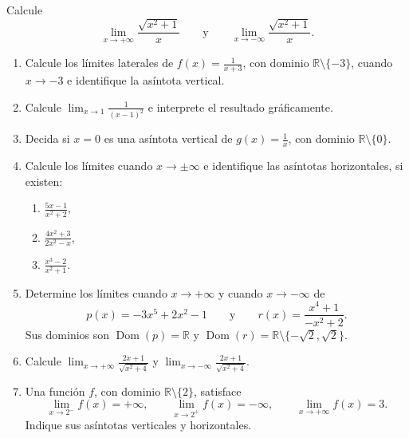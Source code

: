 \documentclass[10pt,a5paper]{article}
\newif\ifmostrarSoluciones
\begin{document}
\begin{ejemplo}
Calcule
\[
  \lim_{x\to+\infty}\frac{\sqrt{x^2+1}}{x}
  \qquad\text{y}\qquad
  \lim_{x\to-\infty}\frac{\sqrt{x^2+1}}{x}.
\]
\end{ejemplo}
\ifmostrarSoluciones
\begin{solucion}
Factorizamos $x^2$ dentro de la raíz:
\[
  \frac{\sqrt{x^2+1}}{x}
  =\frac{\sqrt{x^2\left(1+1/x^2\right)}}{x}
  =\frac{|x|}{x}\sqrt{1+\frac{1}{x^2}}.
\]
Si $x\to+\infty$, entonces $|x|/x=1$; si $x\to-\infty$, entonces $|x|/x=-1$. Por tanto,
\[
  \lim_{x\to+\infty}\frac{\sqrt{x^2+1}}{x}=1,
  \qquad
  \lim_{x\to-\infty}\frac{\sqrt{x^2+1}}{x}=-1.
\]
La gráfica tiene dos asíntotas horizontales: $y=1$ hacia la derecha y $y=-1$ hacia la izquierda.
\end{solucion}
\else\vspace{22mm}\fi

\begin{ejercicios}
\begin{enumerate}
  \item Calcule los límites laterales de $\displaystyle f(x)=\frac{1}{x+3}$, con dominio $\mathbb{R}\setminus\{-3\}$, cuando $x\to-3$ e identifique la asíntota vertical.
  \item Calcule $\displaystyle\lim_{x\to1}\frac{1}{(x-1)^2}$ e interprete el resultado gráficamente.
  \item Decida si $x=0$ es una asíntota vertical de $\displaystyle g(x)=\frac{1}{x}$, con dominio $\mathbb{R}\setminus\{0\}$.
  \item Calcule los límites cuando $x\to\pm\infty$ e identifique las asíntotas horizontales, si existen:
  \begin{enumerate}
    \item $\displaystyle\frac{5x-1}{x^2+2}$,
    \item $\displaystyle\frac{4x^2+3}{2x^2-x}$,
    \item $\displaystyle\frac{x^3-2}{x^2+1}$.
  \end{enumerate}
  \item Determine los límites cuando $x\to+\infty$ y cuando $x\to-\infty$ de
  \[
    p(x)=-3x^5+2x^2-1
    \qquad\text{y}\qquad
    r(x)=\frac{x^4+1}{-x^2+2}.
  \]
  Sus dominios son $\operatorname{Dom}(p)=\mathbb{R}$ y $\operatorname{Dom}(r)=\mathbb{R}\setminus\{-\sqrt{2},\sqrt{2}\}$.
  \item Calcule $\displaystyle\lim_{x\to+\infty}\frac{2x+1}{\sqrt{x^2+4}}$ y $\displaystyle\lim_{x\to-\infty}\frac{2x+1}{\sqrt{x^2+4}}$.
  \item Una función $f$, con dominio $\mathbb{R}\setminus\{2\}$, satisface
  \[
    \lim_{x\to2^-}f(x)=+\infty,
    \qquad
    \lim_{x\to2^+}f(x)=-\infty,
    \qquad
    \lim_{x\to+\infty}f(x)=3.
  \]
  Indique sus asíntotas verticales y horizontales.
\end{enumerate}
\end{ejercicios}
\end{document}
